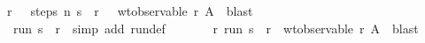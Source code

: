 \begin{isabellebody}
\ \ \isamarkupfalse \ {}\ \isamarkupfalse \ r\ \ {}{\isacharcolon}\ {\isachardoublequoteopen}steps\ {\isacharquery}n\ {\isacharquery}s\ {\isacharequal}\ r{\isachardoublequoteclose}\ \ {}{\isacharcolon}\ {\isachardoublequoteopen}wt{\isacharunderscore}observable\ r\ A{\isachardoublequoteclose}\ \isamarkupfalse \ blast\isanewline
\ \ \isamarkupfalse \ {}\ \isamarkupfalse \ {}{\isacharcolon}\ {\isachardoublequoteopen}run\ s\ {\isacharequal}\ r{\isachardoublequoteclose}\ \isamarkupfalse \ {\isacharparenleft}simp\ add{\isacharcolon}\ run{\isacharunderscore}def{\isacharparenright}\isanewline
\ \ \isamarkupfalse \ {}\ {}\ \isamarkupfalse \ {\isachardoublequoteopen}{\isasymexists}\ r{\isachardot}\ run\ s\ {\isacharequal}\ r\ {\isasymand}\ wt{\isacharunderscore}observable\ r\ A{\isachardoublequoteclose}\ \isamarkupfalse \ blast\isanewline
{}\isamarkupfalse \endisatagproof
{\isafoldproof}\isadelimproof
\isanewline
\endisadelimproof
\isadelimtheory
\isanewline
\endisadelimtheory
\isatagtheory
{}\isamarkupfalse \endisatagtheory
{\isafoldtheory}\isadelimtheory
\endisadelimtheory
\end{isabellebody}